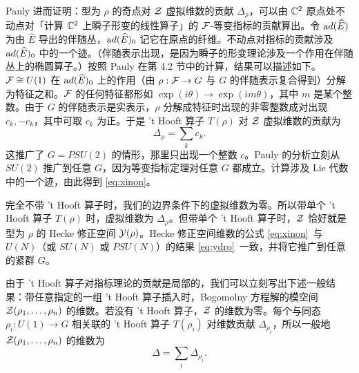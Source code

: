 Pauly 进而证明：型为 $\rho$ 的奇点对 ${\EUZ}$ 虚拟维数的贡献 $\Delta_\rho$，可以由 $\Bbb{C}^2$ 原点处不动点对「计算 $\Bbb{C}^2$ 上瞬子形变的线性算子」的 ${\EUF}$-等变指标的贡献算出。令 ${\rm ad}(\hat E)$ 为由 $\hat E$ 导出的伴随丛，${\rm ad}(\hat E)_0$ 记它在原点的纤维。不动点对指标的贡献涉及 ${\rm ad}(\hat E)_0$ 中的一个迹。（伴随表示出现，是因为瞬子的形变理论涉及一个作用在伴随丛上的椭圆算子。）按照 Pauly 在第 4.2 节中的计算，结果可以描述如下。${\EUF}\cong U(1)$ 在 ${\rm ad}(\hat E)_0$ 上的作用（由 $\rho:{\EUF}\to G$ 与 $G$ 的伴随表示复合得到）分解为特征之和。${\EUF}$ 的任何特征都形如 $\exp(i\theta)\to \exp(im\theta)$，其中 $m$ 是某个整数。由于 $G$ 的伴随表示是实表示，$\rho$ 分解成特征时出现的非零整数成对出现 $c_k,-c_k$，其中可取 $c_k$ 为正。于是 't Hooft 算子 $T(\rho)$ 对 ${\EUZ}$ 虚拟维数的贡献为
\setcounter{equation}{3}
\begin{equation}\label{eq:xinon}
\Delta_\rho=\sum_kc_k.
\end{equation}
这推广了 $G=PSU(2)$ 的情形，那里只出现一个整数 $c$。Pauly 的分析立刻从 $SU(2)$ 推广到任意 $G$，因为等变指标定理对任意 $G$ 都成立。计算涉及 Lie 代数中的一个迹，由此得到 \eqref{eq:xinon}。

完全不带 't Hooft 算子时，我们的边界条件下的虚拟维数为零。所以带单个 't Hooft 算子 $T(\rho)$ 时，虚拟维数为 $\Delta_\rho$。但带单个 't Hooft 算子时，${\EUZ}$ 恰好就是型为 $\rho$ 的 Hecke 修正空间 ${{\EUY}}(\rho)$。Hecke 修正空间维数的公式 \eqref{eq:xinon}\ 与 $U(N)$（或 $SU(N)$ 或 $PSU(N)$）的结果 \eqref{eq:ydro}\ 一致，并将它推广到任意的紧群 $G$。

由于 't Hooft 算子对指标理论的贡献是局部的，我们可以立刻写出下述一般结果：带任意指定的一组 't Hooft 算子插入时，Bogomolny 方程解的模空间 ${\EUZ}(\rho_1,\dots,\rho_n)$ 的维数。若没有 't Hooft 算子，${\EUZ}$ 的维数为零。每个与同态 $\rho_i:U(1)\to G$ 相关联的 't Hooft 算子 $T(\rho_i)$ 对维数贡献 $\Delta_{\rho_i}$，所以一般地 ${\EUZ}(\rho_1,\dots,\rho_n)$ 的维数为
\setcounter{equation}{4}
\begin{equation}\label{eq:migoty}
\Delta=\sum_i\Delta_{\rho_i}.
\end{equation}

